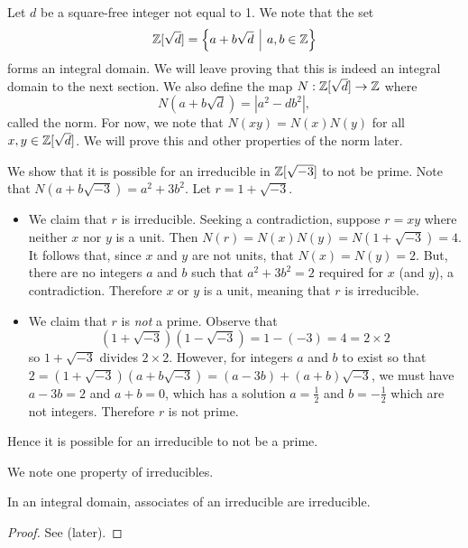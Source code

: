 Let $d$ be a square-free integer not equal to 1. We note that the set
\[
    \Z[\sqrt{d}] = \left\{a + b\sqrt{d} \vert a,b \in \Z\right\}
\]
forms an integral domain. We will leave proving that this is indeed an integral domain to the next section. We also define the map $N: \mathbb{Z}[\sqrt{d}] \to \mathbb{Z}$ where
\[
    N(a+b\sqrt{d}) = |a^2 - db^2|,
\]
called the norm. For now, we note that $N(xy) = N(x)N(y)$ for all $x, y \in \mathbb{Z}[\sqrt{d}]$. We will prove this and other properties of the norm later.

\begin{example}
    We show that it is possible for an irreducible in $\mathbb{Z}[\sqrt{-3}]$ to not be prime. Note that $N(a+b\sqrt{-3}) = a^2 + 3b^2$. Let $r = 1 + \sqrt{-3}$.
    \begin{itemize}
        \item We claim that $r$ is irreducible. Seeking a contradiction, suppose $r = xy$ where neither $x$ nor $y$ is a unit. Then $N(r) = N(x)N(y) = N(1+\sqrt{-3}) = 4$. It follows that, since $x$ and $y$ are not units, that $N(x) = N(y) = 2$. But, there are no integers $a$ and $b$ such that $a^2 + 3b^2 = 2$ required for $x$ (and $y$), a contradiction. Therefore $x$ or $y$ is a unit, meaning that $r$ is irreducible.

        \item We claim that $r$ is \textit{not} a prime. Observe that
        \[
            (1+\sqrt{-3})(1-\sqrt{-3}) = 1-(-3) = 4 = 2 \times 2
        \]
        so $1 + \sqrt{-3}$ divides $2 \times 2$. However, for integers $a$ and $b$ to exist so that $2 = (1+\sqrt{-3})(a+b\sqrt{-3}) = (a-3b) + (a+b)\sqrt{-3}$, we must have $a - 3b = 2$ and $a + b = 0$, which has a solution $a = \frac12$ and $b = -\frac12$ which are not integers. Therefore $r$ is not prime.
    \end{itemize}
    Hence it is possible for an irreducible to not be a prime.
\end{example}

We note one property of irreducibles.
\begin{proposition}\label{prop-associates-of-irreducible-is-irreducible}
    In an integral domain, associates of an irreducible are irreducible.
\end{proposition}
\begin{proof}
    See  (later).
\end{proof}

